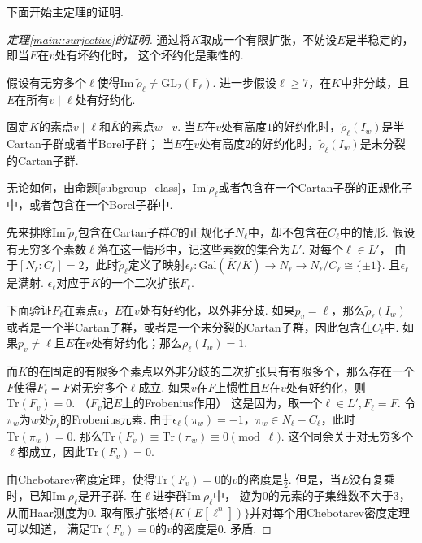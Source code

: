下面开始主定理的证明.
\begin{proof}[定理\ref{main::surjective}的证明]
    通过将$K$取成一个有限扩张，不妨设$E$是半稳定的，即当$E$在$v$处有坏约化时，
    这个坏约化是乘性的.

    假设有无穷多个$\ell$使得$\mathrm{Im}\ \tilde{\rho}_{\ell}\neq \mathrm{GL}_2(\mathbb{F}_{\ell})$.
    进一步假设$\ell\geq 7$，在$K$中非分歧，且$E$在所有$v\mid \ell$处有好约化.

    固定$K$的素点$v\mid \ell$和$\overline{K}$的素点$w\mid v$.
    当$E$在$v$处有高度$1$的好约化时，$\tilde{\rho}_{\ell}(I_w)$是半Cartan子群或者半Borel子群；
    当$E$在$v$处有高度$2$的好约化时，$\tilde{\rho}_{\ell}(I_w)$是未分裂的Cartan子群.
    
    无论如何，由命题\ref{subgroup_class}，$\mathrm{Im}\ \tilde{\rho}_{\ell}$或者包含在一个Cartan子群的正规化子中，或者包含在一个Borel子群中.
    \vskip0.3cm

    先来排除$\mathrm{Im}\ \tilde{\rho}_{\ell}$包含在Cartan子群$C$的正规化子$N_{\ell}$中，却不包含在$C_{\ell}$中的情形.
    假设有无穷多个素数$\ell$落在这一情形中，记这些素数的集合为$L'$. 对每个$\ell\in L'$，
    由于$[N_{\ell}:C_{\ell}]=2$，此时$\tilde{\rho}_{\ell}$定义了映射$\epsilon_{\ell}:\mathrm{Gal}(\overline{K}/K) \to N_{\ell}\to N_{\ell}/C_{\ell} \cong \{\pm 1\}$. 且$\epsilon_{\ell}$是满射.
    $\epsilon_{\ell}$对应于$K$的一个二次扩张$F_{\ell}$.

    下面验证$F_{\ell}$在素点$v$，$E$在$v$处有好约化，以外非分歧.
    如果$p_v=\ell$，那么$\tilde{\rho}_{\ell}(I_w)$或者是一个半Cartan子群，或者是一个未分裂的Cartan子群，因此包含在$C_{\ell}$中. 如果$p_v\neq \ell$且$E$在$v$处有好约化；那么$\rho_{\ell}(I_w) = 1$.

    而$K$的在固定的有限多个素点以外非分歧的二次扩张只有有限多个，那么存在一个$F$使得$F_{\ell} =F$对无穷多个$\ell$成立.
    如果$v$在$F$上惯性且$E$在$v$处有好约化，则$\mathrm{Tr}(F_v) = 0$.
    （$F_v$记$\tilde{E}$上的Frobenius作用）
    这是因为，取一个$\ell\in L',F_{\ell}=F$.
    令$\pi_w$为$w$处$\tilde{\rho}_{\ell}$的Frobenius元素.
    由于$\epsilon_{\ell}(\pi_{w})=-1$，$\pi_{w}\in N_{\ell}-C_{\ell}$，此时$\mathrm{Tr}(\pi_w)=0$.
    那么$\mathrm{Tr}(F_v)\equiv \mathrm{Tr}(\pi_{w})\equiv 0\pmod{\ell}$.
    这个同余关于对无穷多个$\ell$都成立，因此$\mathrm{Tr}(F_v) = 0$.

    由Chebotarev密度定理，使得$\mathrm{Tr}(F_v)= 0$的$v$的密度是$\frac{1}{2}$.
    但是，当$E$没有复乘时，已知$\mathrm{Im}\ \rho_{\ell}$是开子群.
    在$\ell$进李群$\mathrm{Im}\ \rho_{\ell}$中，
    迹为$0$的元素的子集维数不大于$3$，从而Haar测度为$0$.
    取有限扩张塔$\{K(E[\ell^n])\}$并对每个用Chebotarev密度定理可以知道，
    满足$\mathrm{Tr}(F_v)=0$的$v$的密度是$0$. 矛盾.


\end{proof}
